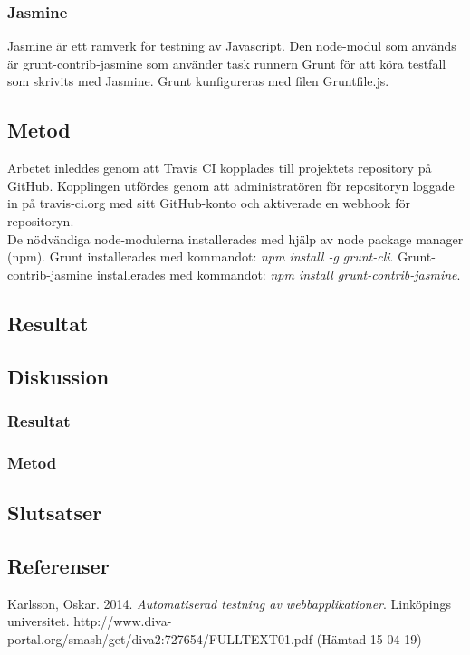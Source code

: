 \subsubsection{Jasmine}
Jasmine är ett ramverk för testning av Javascript. 
Den node-modul som används är grunt-contrib-jasmine som använder task runnern Grunt 
för att köra testfall som skrivits med Jasmine.
Grunt kunfigureras med filen Gruntfile.js.

\subsection{Metod}
Arbetet inleddes genom att Travis CI kopplades till projektets repository på GitHub. Kopplingen utfördes
genom att administratören för repositoryn loggade in på travis-ci.org med sitt GitHub-konto och aktiverade
en webhook för repositoryn.\\

De nödvändiga node-modulerna installerades med hjälp av node package manager (npm). Grunt installerades
med kommandot: \emph{npm install -g grunt-cli}. Grunt-contrib-jasmine installerades med kommandot: 
\emph{npm install grunt-contrib-jasmine}.


\subsection{Resultat}
\subsection{Diskussion}
\subsubsection{Resultat}
\subsubsection{Metod}
\subsection{Slutsatser}
\subsection{Referenser}
Karlsson, Oskar. 2014. \textit{Automatiserad testning av webbapplikationer}. Linköpings universitet.
http://www.diva-portal.org/smash/get/diva2:727654/FULLTEXT01.pdf (Hämtad 15-04-19)
